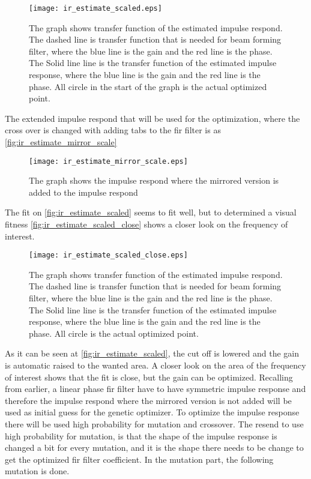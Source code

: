 \begin{figure}[H]
	\centering
	\texttt{[image: ir\_estimate\_scaled.eps]}
	\caption{The graph shows transfer function of the estimated impulse respond. The dashed line is transfer function that is needed for beam forming filter, where the blue line is the gain and the red line is the phase. The Solid line line is the transfer function of the estimated impulse response, where the blue line is the gain and the red line is the phase. All circle in the start of the graph is the actual optimized point.}
		\label{fig:ir_estimate_scaled}
\end{figure}


The extended impulse respond that will be used for the optimization, where the cross over is changed with adding tabs to the \gls{fir} filter is as \autoref{fig:ir_estimate_mirror_scale}

\begin{figure}[H]
	\centering
	\texttt{[image: ir\_estimate\_mirror\_scale.eps]}
	\caption{The graph shows the impulse respond where the mirrored version is added to the impulse respond}
		\label{fig:ir_estimate_mirror_scale}
\end{figure}


The fit on \autoref{fig:ir_estimate_scaled} seems to fit well, but to determined a visual fitness \autoref{fig:ir_estimate_scaled_close} shows a closer look on the frequency of interest.


\begin{figure}[H]
	\centering
	\texttt{[image: ir\_estimate\_scaled\_close.eps]}
	\caption{The graph shows transfer function of the estimated impulse respond. The dashed line is transfer function that is needed for beam forming filter, where the blue line is the gain and the red line is the phase. The Solid line line is the transfer function of the estimated impulse response, where the blue line is the gain and the red line is the phase. All circle is the actual optimized point.}
		\label{fig:ir_estimate_scaled_close}
\end{figure}

As it can be seen at \autoref{fig:ir_estimate_scaled}, the cut off is lowered and the gain is automatic raised to the wanted area. A closer look on the area of the frequency of interest shows that the fit is close, but the gain can be optimized. Recalling from earlier, a linear phase \gls{fir} filter have to have symmetric impulse response and therefore the impulse respond where the mirrored version is not added will be used as initial guess for the genetic optimizer. To optimize the impulse response there will be used high probability for mutation and crossover. The resend to use high probability for mutation, is that the shape of the impulse response is changed a bit for every mutation, and it is the shape there needs to be change to get the optimized \gls{fir} filter coefficient. In the mutation part, the following mutation is done.

